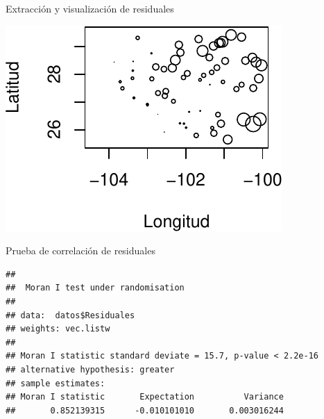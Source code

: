 \documentclass[
  11pt,
  ignorenonframetext,
]{beamer}
\newenvironment{Shaded}{}{}
\newcommand{\AttributeTok}[1]{\textcolor[rgb]{0.49,0.56,0.16}{#1}}
\newcommand{\FloatTok}[1]{\textcolor[rgb]{0.25,0.63,0.44}{#1}}
\newcommand{\FunctionTok}[1]{\textcolor[rgb]{0.02,0.16,0.49}{#1}}
\newcommand{\NormalTok}[1]{#1}
\newcommand{\OtherTok}[1]{\textcolor[rgb]{0.00,0.44,0.13}{#1}}
\newcommand{\SpecialCharTok}[1]{\textcolor[rgb]{0.25,0.44,0.63}{#1}}
\begin{document}
\begin{frame}[fragile]{Extracción y visualización de residuales}
\protect\hypertarget{extracciuxf3n-y-visualizaciuxf3n-de-residuales}{}
\begin{Shaded}
\end{Shaded}

\begin{center}\includegraphics{Usos-Moran_files/figure-beamer/unnamed-chunk-9-1} \end{center}
\end{frame}

\begin{frame}[fragile]{Prueba de correlación de residuales}
\protect\hypertarget{prueba-de-correlaciuxf3n-de-residuales}{}
\begin{Shaded}
\end{Shaded}

\begin{verbatim}
## 
##  Moran I test under randomisation
## 
## data:  datos$Residuales  
## weights: vec.listw    
## 
## Moran I statistic standard deviate = 15.7, p-value < 2.2e-16
## alternative hypothesis: greater
## sample estimates:
## Moran I statistic       Expectation          Variance 
##       0.852139315      -0.010101010       0.003016244
\end{verbatim}
\end{frame}
\end{document}
